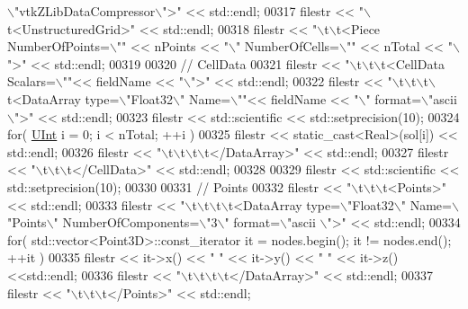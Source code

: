 \begin{DoxyCode}
{      \(\backslash\)"vtkZLibDataCompressor\(\backslash\)">"} << std::endl;
00317     filestr << \textcolor{stringliteral}{"\(\backslash\)t<UnstructuredGrid>"} << std::endl;
00318     filestr << \textcolor{stringliteral}{"\(\backslash\)t\(\backslash\)t<Piece NumberOfPoints=\(\backslash\)""} << nPoints << \textcolor{stringliteral}{"\(\backslash\)" NumberOfCells=\(\backslash\)""} << nTotal << \textcolor{stringliteral}{"\(\backslash\)">"} << 
      std::endl;
00319 
00320     \textcolor{comment}{// CellData}
00321     filestr << \textcolor{stringliteral}{"\(\backslash\)t\(\backslash\)t\(\backslash\)t<CellData Scalars=\(\backslash\)""}<< fieldName << \textcolor{stringliteral}{"\(\backslash\)">"} << std::endl;
00322     filestr << \textcolor{stringliteral}{"\(\backslash\)t\(\backslash\)t\(\backslash\)t\(\backslash\)t<DataArray type=\(\backslash\)"Float32\(\backslash\)" Name=\(\backslash\)""}<< fieldName << \textcolor{stringliteral}{"\(\backslash\)" format=\(\backslash\)"ascii\(\backslash\)">"} << 
      std::endl;
00323     filestr << std::scientific << std::setprecision(10);
00324     \textcolor{keywordflow}{for}( \hyperlink{namespaceFVCode3D_a4bf7e328c75d0fd504050d040ebe9eda}{UInt} i = 0; i < nTotal; ++i )
00325         filestr << static\_cast<Real>(sol[i]) << std::endl;
00326     filestr << \textcolor{stringliteral}{"\(\backslash\)t\(\backslash\)t\(\backslash\)t\(\backslash\)t</DataArray>"} << std::endl;
00327     filestr << \textcolor{stringliteral}{"\(\backslash\)t\(\backslash\)t\(\backslash\)t</CellData>"} << std::endl;
00328 
00329     filestr << std::scientific << std::setprecision(10);
00330 
00331     \textcolor{comment}{// Points}
00332     filestr << \textcolor{stringliteral}{"\(\backslash\)t\(\backslash\)t\(\backslash\)t<Points>"} << std::endl;
00333     filestr << \textcolor{stringliteral}{"\(\backslash\)t\(\backslash\)t\(\backslash\)t\(\backslash\)t<DataArray type=\(\backslash\)"Float32\(\backslash\)" Name=\(\backslash\)"Points\(\backslash\)" NumberOfComponents=\(\backslash\)"3\(\backslash\)" format=\(\backslash\)"ascii
      \(\backslash\)">"} << std::endl;
00334     \textcolor{keywordflow}{for}( std::vector<Point3D>::const\_iterator it = nodes.begin(); it != nodes.end(); ++it )
00335         filestr << it->x() << \textcolor{stringliteral}{" "} << it->y() << \textcolor{stringliteral}{" "} << it->z() <<std::endl;
00336     filestr << \textcolor{stringliteral}{"\(\backslash\)t\(\backslash\)t\(\backslash\)t\(\backslash\)t</DataArray>"} << std::endl;
00337     filestr << \textcolor{stringliteral}{"\(\backslash\)t\(\backslash\)t\(\backslash\)t</Points>"} << std::endl;

\end{DoxyCode}
